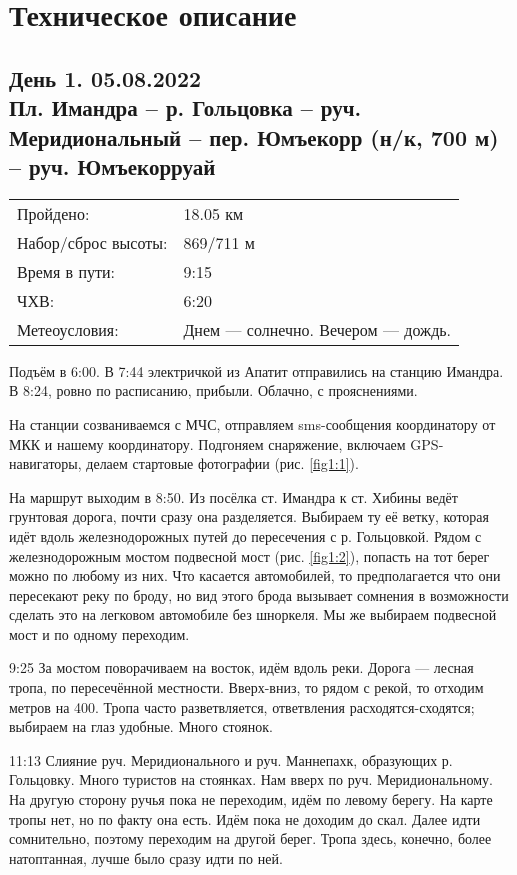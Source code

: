 \section{Техническое описание}
\subsection{День 1. 05.08.2022\\
Пл. Имандра -- р. Гольцовка -- руч. Меридиональный -- пер. Юмъекорр (н/к, 700 м) -- руч. Юмъекорруай}
\begin{tabular}{l p{12cm}}
\hline
Пройдено: & 18.05 км\\
Набор/сброс высоты: & 869/711 м\\
Время в пути: & 9:15\\
ЧХВ: & 6:20\\
Метеоусловия: & Днем --- солнечно. Вечером --- дождь.\\
\hline
\end{tabular}

Подъём в 6:00.
В 7:44 электричкой из Апатит отправились на станцию Имандра. В 8:24, ровно по расписанию, прибыли. Облачно, с прояснениями.

На станции созваниваемся с МЧС, отправляем sms-сообщения координатору от МКК и нашему координатору.
Подгоняем снаряжение, включаем GPS-навигаторы, делаем стартовые фотографии (рис. \ref{fig1:1}).

На маршрут выходим в 8:50. Из посёлка ст. Имандра к ст. Хибины ведёт грунтовая дорога, почти сразу она разделяется.
Выбираем ту её ветку, которая идёт вдоль железнодорожных путей до пересечения с р. Гольцовкой.
Рядом с железнодорожным мостом подвесной мост (рис. \ref{fig1:2}), попасть на тот берег можно по любому из них.
Что касается автомобилей, то предполагается что они пересекают реку по броду, но вид этого брода вызывает сомнения
в возможности сделать это на легковом автомобиле без шноркеля. Мы же выбираем подвесной мост и по одному переходим.

9:25 За мостом поворачиваем на восток, идём вдоль реки. Дорога --- лесная тропа, по пересечённой местности.
Вверх-вниз, то рядом с рекой, то отходим метров на 400. Тропа часто разветвляется, ответвления расходятся-сходятся;
выбираем на глаз удобные. Много стоянок.

11:13 Слияние руч. Меридионального и руч. Маннепахк, образующих р. Гольцовку. Много туристов на стоянках.
Нам вверх по руч. Меридиональному. На другую сторону ручья пока не переходим, идём по левому берегу.
На карте тропы нет, но по факту она есть. Идём пока не доходим до скал. Далее идти сомнительно,
поэтому переходим на другой берег. Тропа здесь, конечно, более натоптанная, лучше было сразу идти по ней.

